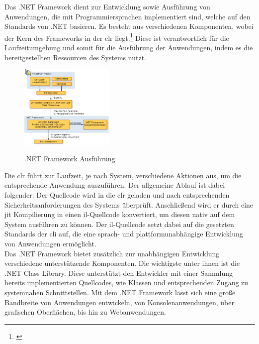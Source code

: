 Das .NET Framework dient zur Entwicklung sowie Ausführung von Anwendungen, die mit Programmiersprachen implementiert sind, welche auf den Standards von .NET basieren. Es besteht aus verschiedenen Komponenten, wobei der Kern des Frameworks in der \gls{clr} liegt.\footnote{\citep[vgl.][Overview of the .NET Framework]{Microsoft.Overviewof}\label{note42}} Diese ist verantwortlich für die Laufzeitumgebung und somit für die Ausführung der Anwendungen, indem es die bereitgestellten Ressourcen des Systems nutzt.
\newpage
\begin{figure}
	\begin{center}
		\includegraphics[width=0.4\textwidth]{images/technische_grundlagen/net_aufbau.jpeg}
	\end{center}
	\caption{.NET Framework Ausführung}
	\cite{Microsoft.Introductionto}
	\label{fig:net}
\end{figure}

\noindent
Die \gls{clr} führt zur Laufzeit, je nach System, verschiedene Aktionen aus, um die entsprechende Anwendung auszuführen. Der allgemeine Ablauf ist dabei folgender: Der Quellcode wird in die \gls{clr} geladen und nach entsprechenden Sicherheitsanforderungen des Systems überprüft. Anschließend wird er durch eine \gls{jit} Kompilierung in einen \gls{il}-Quellcode konvertiert, um diesen nativ auf dem System ausführen zu können. Der \gls{il}-Quellcode setzt dabei auf die gesetzten Standards der \gls{cli} auf, die eine sprach- und plattformunabhängige Entwicklung von Anwendungen ermöglicht.\\
Das .NET Framework bietet zusätzlich zur unabhängigen Entwicklung verschiedene unterstützende Komponenten. Die wichtigste unter ihnen ist die .NET Class Library. Diese unterstützt den Entwickler mit einer Sammlung bereits implementierten Quellcodes, wie Klassen und entsprechenden Zugang zu systemnahen Schnittstellen. Mit dem .NET Framework lässt sich eine große Bandbreite von Anwendungen entwickeln, von Konsolenanwendungen, über grafischen Oberflächen, bis hin zu Webanwendungen.\\

